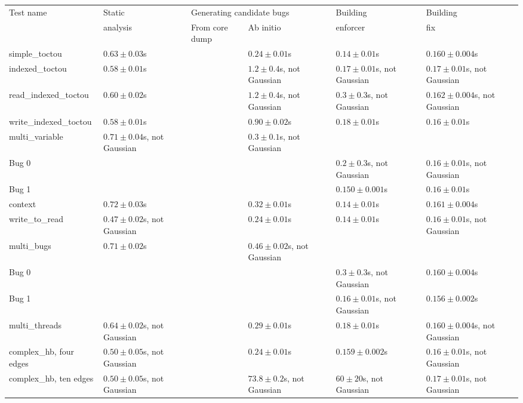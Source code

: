\begin{tabular}{l|p{3.6cm}|p{3.6cm}|p{3.6cm}|p{3.6cm}|p{3.6cm}}
Test name              & Static                  & \multicolumn{2}{l|}{Generating candidate bugs} & Building & Building \\
\cline{3-4}            & analysis                & From core dump & Ab initio                     & enforcer & fix      \\
\hline
\hline{}simple\_toctou         & $0.63 \pm 0.03$s     &        & $0.24 \pm 0.01$s     & $0.14 \pm 0.01$s     & $0.160 \pm 0.004$s   \\
\hline{}indexed\_toctou        & $0.58 \pm 0.01$s     &        & $1.2 \pm 0.4$s, not Gaussian & $0.17 \pm 0.01$s, not Gaussian & $0.17 \pm 0.01$s, not Gaussian \\
\hline{}read\_indexed\_toctou  & $0.60 \pm 0.02$s     &        & $1.2 \pm 0.4$s, not Gaussian & $0.3 \pm 0.3$s, not Gaussian & $0.162 \pm 0.004$s, not Gaussian \\
\hline{}write\_indexed\_toctou & $0.58 \pm 0.01$s     &        & $0.90 \pm 0.02$s     & $0.18 \pm 0.01$s     & $0.16 \pm 0.01$s     \\
\hline{}multi\_variable        & $0.71 \pm 0.04$s, not Gaussian &        & $0.3 \pm 0.1$s, not Gaussian & \\
\hspace{20pt}Bug 0     & & & & $0.2 \pm 0.3$s, not Gaussian & $0.16 \pm 0.01$s, not Gaussian \\
\hspace{20pt}Bug 1     & & & & $0.150 \pm 0.001$s   & $0.16 \pm 0.01$s     \\
\hline{}context                & $0.72 \pm 0.03$s     &        & $0.32 \pm 0.01$s     & $0.14 \pm 0.01$s     & $0.161 \pm 0.004$s   \\
\hline{}write\_to\_read        & $0.47 \pm 0.02$s, not Gaussian &        & $0.24 \pm 0.01$s     & $0.14 \pm 0.01$s     & $0.16 \pm 0.01$s, not Gaussian \\
\hline{}multi\_bugs            & $0.71 \pm 0.02$s     &        & $0.46 \pm 0.02$s, not Gaussian & \\
\hspace{20pt}Bug 0     & & & & $0.3 \pm 0.3$s, not Gaussian & $0.160 \pm 0.004$s   \\
\hspace{20pt}Bug 1     & & & & $0.16 \pm 0.01$s, not Gaussian & $0.156 \pm 0.002$s   \\
\hline{}multi\_threads         & $0.64 \pm 0.02$s, not Gaussian &        & $0.29 \pm 0.01$s     & $0.18 \pm 0.01$s     & $0.160 \pm 0.004$s, not Gaussian \\
\hline{}complex\_hb, four edges & $0.50 \pm 0.05$s, not Gaussian &        & $0.24 \pm 0.01$s     & $0.159 \pm 0.002$s   & $0.16 \pm 0.01$s, not Gaussian \\
\hline{}complex\_hb, ten edges & $0.50 \pm 0.05$s, not Gaussian &        & $73.8 \pm 0.2$s, not Gaussian & $60 \pm 20$s, not Gaussian & $0.17 \pm 0.01$s, not Gaussian \\
\end{tabular}
